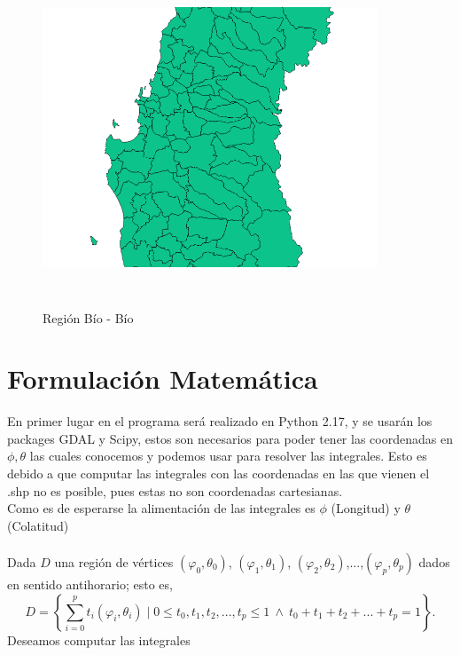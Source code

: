 \documentclass[20pt]{report}
\begin{document}
\begin{itemize}
\begin{figure}[H]
\begin{center}
\includegraphics[width=10cm, height=10cm]{biobio.png}
\vspace{-0.5cm} %
\caption{Regi\'on B\'io - B\'io}
\label{Label para referencia}
\end{center}
\end{figure}


\label{cap.introduccion}\section{Formulaci\'on Matem\'atica }
En primer lugar en el programa ser\'a realizado en Python 2.17, y se usar\'an los packages GDAL y Scipy, estos son necesarios para poder tener las coordenadas en  $\phi,\theta$ las cuales  conocemos y podemos usar para resolver las integrales. Esto es debido a que computar las integrales  con las coordenadas en las que vienen el .shp no es posible, pues estas no son coordenadas cartesianas.
\\
Como es de esperarse la alimentaci\'on de las integrales es $\phi$ (Longitud) y $\theta$ (Colatitud)
\\
\\

Dada $D$ una regi\'on de v\'ertices $(\varphi_0, \theta_0)$, $(\varphi_1, \theta_1)$, $(\varphi_2, \theta_2)$,...,$(\varphi_p, \theta_p)$ dados en sentido antihorario; esto es,
\begin{equation}\label{T}
D = \left\{ \sum_{i=0}^p t_i (\varphi_i, \theta_i) \mid 0 \leq t_0, t_1, t_2,...,t_p \leq 1 \ \wedge \ t_0+t_1+t_2+...+t_p=1 \right\}.
\end{equation}
Deseamos computar las integrales


\end{itemize}
\end{document}
